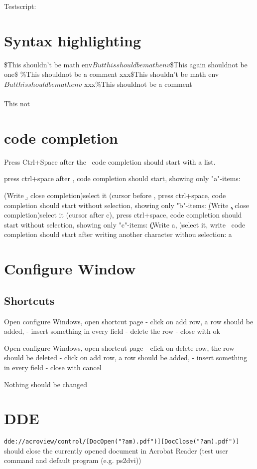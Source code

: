 Testscript:

\section{Syntax highlighting}
\$This shouldn't be math env$But this should be math env$\$This again shouldnot be one\$
\%This shouldnot be a comment%
xxx\$This shouldn't be math env$But this should be math env$
xxx\%This shouldnot be a comment%
\thisShouldBeACommand\\\ThisToo\\This not

\section{code completion}

Press Ctrl+Space after the \, code completion should start with a list. 
\

press ctrl+space after \a, code completion should start, showing only "a"-items:
\a


(Write \b, close completion)select it (cursor before \), press ctrl+space, code completion should start without selection, showing only "b"-items:
\b

(Write \c, close completion)select it (cursor after c), press ctrl+space, code completion should start without selection, showing only "c"-items:
\c

(Write a, )select it, write \, code completion should start after writing another character withou selection:
a

\section{Configure Window}
\subsection{Shortcuts}
Open configure Windows, open shortcut page
   - click on add row, a row should be added, 
   - insert something in every field
   - delete the row
   - close with ok

Open configure Windows, open shortcut page
   - click on delete row, the row should be deleted
   - click on add row, a row should be added, 
   - insert something in every field
   - close with cancel
   
Nothing should be changed

\section{DDE}
\verb+dde://acroview/control/[DocOpen("?am).pdf")][DocClose("?am).pdf")]+ should close the currently opened document in Acrobat Reader (test user command and default program (e.g. ps2dvi))